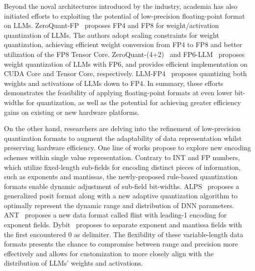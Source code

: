Beyond the noval architectures introduced by the industry, academia has also initiated efforts to exploiting the potential of low-precision floating-point format on LLMs.
ZeroQuant-FP~\citep{wu2023zeroquant} proposes FP4 and FP8 for weight/activation quantization of LLMs. The authors adopt scaling constraints for weight quantization, achieving efficient weight conversion from FP4 to FP8 and better utilization of the FP8 Tensor Core.
ZeroQuant-(4+2)~\citep{wu2023zeroquant1} and FP6-LLM~\citep{xia2024fp6} proposes weight quantization of LLMs with FP6, and provides efficient implementation on CUDA Core and Tensor Core, respectively. 
LLM-FP4~\citep{liu2023llm} proposes quantizing both weights and activations of LLMs down to FP4.
In summary, these efforts demonstrates the feasibility of applying floating-point formats at even lower bit-widths for quantization, as well as the potential for achieving greater efficiency gains on existing or new hardware platforms.

On the other hand, researchers are delving into the refinement of low-precision quantization formats to augment the adaptability of data representation whilst preserving hardware efficiency. 
One line of works propose to explore new encoding schemes within single value representation.
Contrary to INT and FP numbers, which utilize fixed-length sub-fields for encoding distinct pieces of information, such as exponents and mantissas, the newly-proposed rule-based quantization formats enable dynamic adjustment of sub-field bit-widths. 
ALPS~\citep{langroudi2021alps} proposes a generalized posit format along with a new adaptive quantization algorithm to optimally represent the dynamic range and distribution of DNN parameters.
ANT~\citep{guo2022ant} proposes a new data format called flint with leading-1 encoding for exponent fields.
Dybit~\citep{zhou2023dybit} proposes to separate exponent and mantissa fields with the first encountered 0 as delimiter.
The flexibility of these variable-length data formats presents the chance to compromise between range and precision more effectively and allows for customization to more closely align with the distribution of LLMs' weights and activations.

